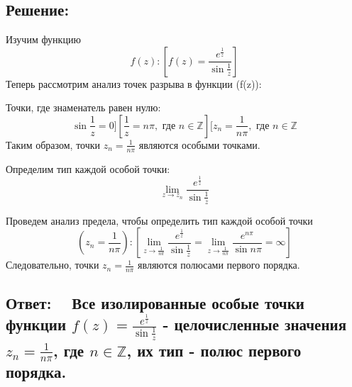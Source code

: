 \documentclass{article}
\begin{document}
	\subsection{Решение:}
        Изучим функцию $$f(z): [f(z) = \frac{e^{\frac{1}{z}}}{\sin{\frac{1}{z}}}]$$
        Теперь рассмотрим анализ точек разрыва в функции (f(z)):
        
        Точки, где знаменатель равен нулю: $$\sin{\frac{1}{z}} = 0] [\frac{1}{z} = n\pi, \text{ где } n \in \mathbb{Z}] [z_n = \frac{1}{n\pi}, \text{ где } n \in \mathbb{Z}$$ Таким образом, точки $z_n = \frac{1}{n\pi}$ являются особыми точками.
        
        Определим тип каждой особой точки: $$\underset{z \to z_n}{\lim} \frac{e^{\frac{1}{z}}}{\sin{\frac{1}{z}}}$$
        
        Проведем анализ предела, чтобы определить тип каждой особой точки 
        $$(z_n = \frac{1}{n\pi}): [\underset{z \to \frac{1}{n\pi}}{\lim} \frac{e^{\frac{1}{z}}}{\sin{\frac{1}{z}}} = \underset{z \to \frac{1}{n\pi}}{\lim} \frac{e^{n\pi}}{\sin{n\pi}} = \infty] $$
        Следовательно, точки $z_n = \frac{1}{n\pi}$ являются полюсами первого порядка.
        
        \subsection{Ответ:$\quad$ Все изолированные особые точки функции $f(z) = \frac{e^{\frac{1}{z}}}{\sin{\frac{1}{z}}}$  - целочисленные значения $z_n = \frac{1}{n\pi}$, где $n \in \mathbb{Z}$, их тип - полюс первого порядка.} 
    
        
\end{document}
